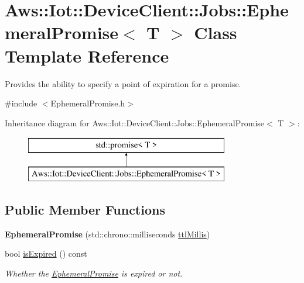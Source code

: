 \hypertarget{class_aws_1_1_iot_1_1_device_client_1_1_jobs_1_1_ephemeral_promise}{}\section{Aws\+:\+:Iot\+:\+:Device\+Client\+:\+:Jobs\+:\+:Ephemeral\+Promise$<$ T $>$ Class Template Reference}
\label{class_aws_1_1_iot_1_1_device_client_1_1_jobs_1_1_ephemeral_promise}


Provides the ability to specify a point of expiration for a promise.  




{\ttfamily \#include $<$Ephemeral\+Promise.\+h$>$}

Inheritance diagram for Aws\+:\+:Iot\+:\+:Device\+Client\+:\+:Jobs\+:\+:Ephemeral\+Promise$<$ T $>$\+:\begin{figure}[H]
\begin{center}
\leavevmode
\includegraphics[height=2.000000cm]{class_aws_1_1_iot_1_1_device_client_1_1_jobs_1_1_ephemeral_promise}
\end{center}
\end{figure}
\subsection*{Public Member Functions}
\begin{DoxyCompactItemize}
\item 
\mbox{\label{class_aws_1_1_iot_1_1_device_client_1_1_jobs_1_1_ephemeral_promise_a8dedc29ad89c996bafb0a7ea52941967}} 
{\bfseries Ephemeral\+Promise} (std\+::chrono\+::milliseconds \hyperlink{class_aws_1_1_iot_1_1_device_client_1_1_jobs_1_1_ephemeral_promise_a3cd168edb7d7de52f978aa6b431ae8c0}{ttl\+Millis})
\item 
bool \hyperlink{class_aws_1_1_iot_1_1_device_client_1_1_jobs_1_1_ephemeral_promise_a4cdc9ca2aaf0aac6a397a1e2a9214c90}{is\+Expired} () const
\begin{DoxyCompactList}\small\item\em Whether the \hyperlink{class_aws_1_1_iot_1_1_device_client_1_1_jobs_1_1_ephemeral_promise}{Ephemeral\+Promise} is expired or not. \end{DoxyCompactList}\end{DoxyCompactItemize}
